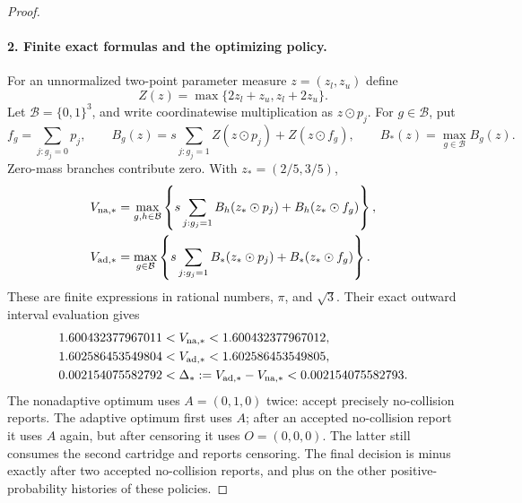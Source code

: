\begin{proof}
\paragraph{2. Finite exact formulas and the optimizing policy.}
For an unnormalized two-point parameter measure $z=(z_l,z_u)$ define
\[
 Z(z)=\max\{2z_l+z_u,z_l+2z_u\}.
\]
Let $\mathcal B=\{0,1\}^3$, and write coordinatewise multiplication as
$z\odot p_j$. For $g\in\mathcal B$, put
\[
 f_g=\sum_{j:g_j=0}p_j,\qquad
 B_g(z)=s\sum_{j:g_j=1}Z(z\odot p_j)+Z(z\odot f_g),
 \qquad B_*(z)=\max_{g\in\mathcal B}B_g(z).
\]
Zero-mass branches contribute zero. With $z_*=(2/5,3/5)$,
\begin{align}
 V_{\rm na,*}&=\max_{g,h\in\mathcal B}
 \left\{s\sum_{j:g_j=1}B_h(z_*\odot p_j)+B_h(z_*\odot f_g)\right\},
 \label{eq:nonadaptive-enumeration}\\
 V_{\rm ad,*}&=\max_{g\in\mathcal B}
 \left\{s\sum_{j:g_j=1}B_*(z_*\odot p_j)+B_*(z_*\odot f_g)\right\}.
 \label{eq:adaptive-enumeration}
\end{align}
These are finite expressions in rational numbers, $\pi$, and $\sqrt3$.
Their exact outward interval evaluation gives
\begin{align*}
 1.600432377967011&<V_{\rm na,*}<1.600432377967012,\\
 1.602586453549804&<V_{\rm ad,*}<1.602586453549805,\\
 0.002154075582792&<\Delta_*:=V_{\rm ad,*}-V_{\rm na,*}
                                      <0.002154075582793.
\end{align*}
The nonadaptive optimum uses $A=(0,1,0)$ twice: accept precisely no-collision
reports. The adaptive optimum first uses $A$; after an accepted no-collision
report it uses $A$ again, but after censoring it uses $O=(0,0,0)$.
The latter still consumes the second cartridge and reports censoring.
The final decision is minus exactly after two accepted no-collision reports,
and plus on the other positive-probability histories of these policies.


\end{proof}
